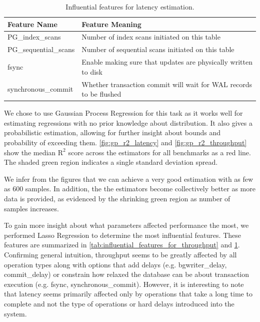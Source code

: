 \begin{table}[h!]
  \centering
  \begin{adjustbox}{max width=0.85\textwidth}
    \begin{tabular}{ll}
      \toprule
      Feature Name          & Feature Meaning                                                    \\
      \midrule
      PG\_index\_scans      & Number of index scans initiated on this table                      \\
      PG\_sequential\_scans & Number of sequential scans initiated on this table                 \\
      fsync                 & Enable making sure that updates are physically written to disk     \\
      synchronous\_commit   & Whether transaction commit will wait for WAL records to be flushed \\
      \bottomrule
    \end{tabular}
  \end{adjustbox}

  \caption{Influential features for latency estimation.}
  \label{tab:influential_features_for_latency}
\end{table}

We chose to use Gaussian Process Regression for this task as it works
well for estimating regressions with no prior knowledge about
distribution. It also gives a probabilistic estimation, allowing for
further insight about bounds and probability of exceeding
them. \cref{fig:gp_r2_latency} and \cref{fig:gp_r2_throughput} show
the median $\textrm{R}^2$ score across the estimators for all
benchmarks as a red line. The shaded green region indicates a single
standard deviation spread.

We infer from the figures that we can achieve a very good estimation
with as few as 600 samples. In addition, the the estimators become
collectively better as more data is provided, as evidenced by the
shrinking green region as number of samples increases.

To gain more insight about what parameters affected performance the
most, we performed Lasso Regression to determine the most influential
features. These features are summarized in
\cref{tab:influential_features_for_throughput} and
\cref{tab:influential_features_for_latency}. Confirming general
intuition, throughput seems to be greatly affected by all operation
types along with options that add delays (e.g. bgwriter\_delay,
commit\_delay) or constrain how relaxed the database can be about
transaction execution (e.g. fsync, synchronous\_commit). However, it
is interesting to note that latency seems primarily affected only by
operations that take a long time to complete and not the type of
operations or hard delays introduced into the system.

